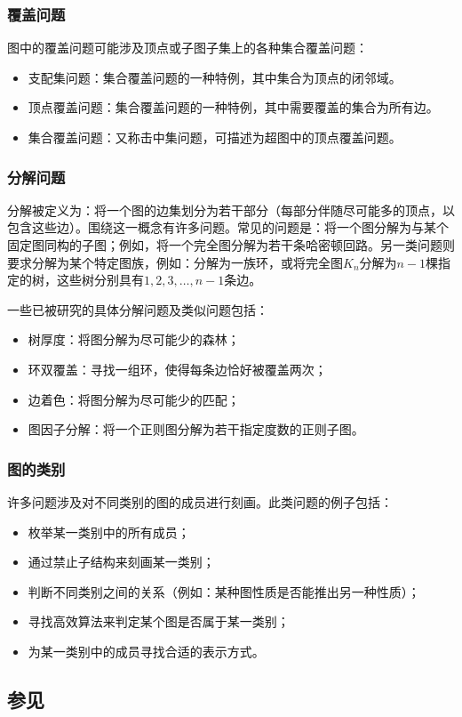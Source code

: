 \subsubsection{覆盖问题}
图中的覆盖问题可能涉及顶点或子图子集上的各种集合覆盖问题：
\begin{itemize}
\item 支配集问题：集合覆盖问题的一种特例，其中集合为顶点的闭邻域。
\item 顶点覆盖问题：集合覆盖问题的一种特例，其中需要覆盖的集合为所有边。
\item 集合覆盖问题：又称击中集问题，可描述为超图中的顶点覆盖问题。
\end{itemize}
\subsubsection{分解问题}
分解被定义为：将一个图的边集划分为若干部分（每部分伴随尽可能多的顶点，以包含这些边）。围绕这一概念有许多问题。常见的问题是：将一个图分解为与某个固定图同构的子图；例如，将一个完全图分解为若干条哈密顿回路。另一类问题则要求分解为某个特定图族，例如：分解为一族环，或将完全图$K_n$分解为$n-1$棵指定的树，这些树分别具有$1,2,3,\ldots,n-1$条边。

一些已被研究的具体分解问题及类似问题包括：
\begin{itemize}
\item 树厚度：将图分解为尽可能少的森林；
\item 环双覆盖：寻找一组环，使得每条边恰好被覆盖两次；
\item 边着色：将图分解为尽可能少的匹配；
\item 图因子分解：将一个正则图分解为若干指定度数的正则子图。
\end{itemize}
\subsubsection{图的类别}
许多问题涉及对不同类别的图的成员进行刻画。此类问题的例子包括：
\begin{itemize}
\item 枚举某一类别中的所有成员；
\item 通过禁止子结构来刻画某一类别；
\item 判断不同类别之间的关系（例如：某种图性质是否能推出另一种性质）；
\item 寻找高效算法来判定某个图是否属于某一类别；
\item 为某一类别中的成员寻找合适的表示方式。
\end{itemize}
\subsection{参见}

